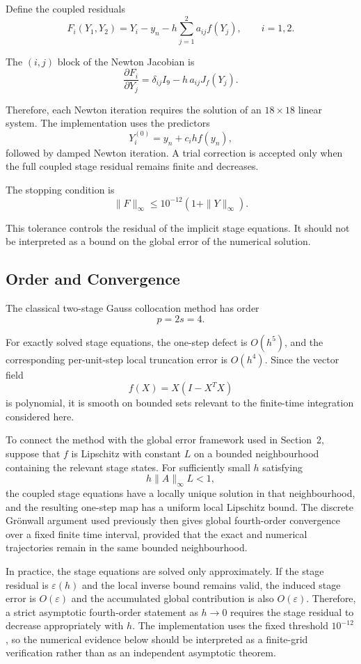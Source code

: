 Define the coupled residuals
\[
F_i(Y_1,Y_2)
=
Y_i-y_n-h\sum_{j=1}^{2}a_{ij}f(Y_j),
\qquad i=1,2.
\]

The $(i,j)$ block of the Newton Jacobian is
\[
\frac{\partial F_i}{\partial Y_j}
=
\delta_{ij}I_9-h\,a_{ij}J_f(Y_j).
\]

Therefore, each Newton iteration requires the solution of an
$18\times18$ linear system. The implementation uses the predictors
\[
Y_i^{(0)}
=
y_n+c_i h f(y_n),
\]
followed by damped Newton iteration. A trial correction is accepted only
when the full coupled stage residual remains finite and decreases.

The stopping condition is
\[
\|F\|_{\infty}
\le
10^{-12}\left(1+\|Y\|_{\infty}\right).
\]

This tolerance controls the residual of the implicit stage equations. It
should not be interpreted as a bound on the global error of the numerical
solution.

\subsection{Order and Convergence}

The classical two-stage Gauss collocation method has order
\[
p=2s=4.
\]

For exactly solved stage equations, the one-step defect is
$O(h^5)$, and the corresponding per-unit-step local truncation error is
$O(h^4)$. Since the vector field
\[
f(X)=X(I-X^TX)
\]
is polynomial, it is smooth on bounded sets relevant to the finite-time
integration considered here.

To connect the method with the global error framework used in
Section~2, suppose that $f$ is Lipschitz with constant $L$ on a bounded
neighbourhood containing the relevant stage states. For sufficiently
small $h$ satisfying
\[
h\|A\|_{\infty}L<1,
\]
the coupled stage equations have a locally unique solution in that
neighbourhood, and the resulting one-step map has a uniform local
Lipschitz bound. The discrete Gr\"onwall argument used previously then
gives global fourth-order convergence over a fixed finite time interval,
provided that the exact and numerical trajectories remain in the same
bounded neighbourhood.

In practice, the stage equations are solved only approximately. If the
stage residual is $\varepsilon(h)$ and the local inverse bound remains
valid, the induced stage error is $O(\varepsilon)$ and the accumulated
global contribution is also $O(\varepsilon)$. Therefore, a strict
asymptotic fourth-order statement as $h\to0$ requires the stage residual
to decrease appropriately with $h$. The implementation uses the fixed
threshold $10^{-12}$, so the numerical evidence below should be
interpreted as a finite-grid verification rather than as an independent
asymptotic theorem.

